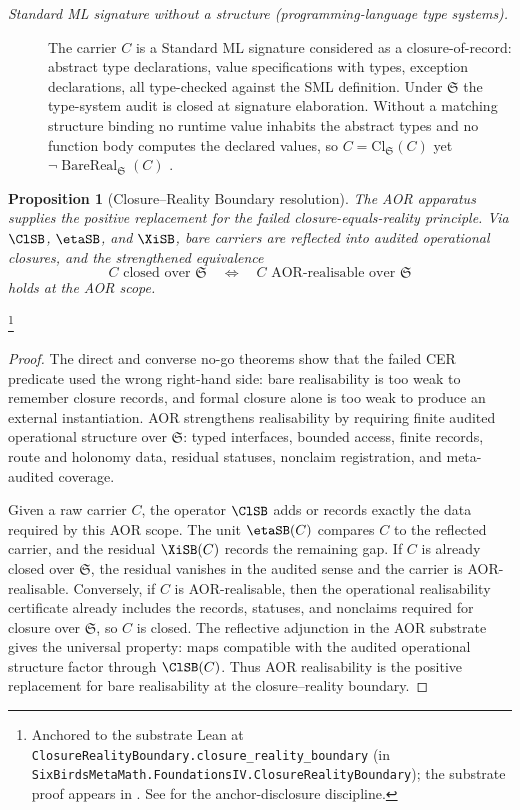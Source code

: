 \documentclass[11pt]{article}
\newtheorem{proposition}[theorem]{Proposition}
\theoremstyle{definition}
\begin{document}
\begin{description}
\item[\emph{Standard {ML} signature without a
structure (programming-language type systems).}]
The carrier \(C\) is a Standard ML signature
considered as a closure-of-record: abstract type
declarations, value specifications with types,
exception declarations, all type-checked against
the SML definition.  Under \(\mathfrak S\) the
type-system audit is closed at signature
elaboration.  Without a matching structure binding
no runtime value inhabits the abstract types and
no function body computes the declared values, so
\(C=\mathrm{Cl}_{\mathfrak S}(C)\) yet \(\neg
\operatorname{BareReal}_{\mathfrak S}(C)\)
\citep{MacQueen1984Modules}.
\end{description}

\begin{proposition}[Closure--Reality Boundary resolution]\label{prop:F53}
The AOR apparatus supplies the positive replacement for the failed
closure-equals-reality principle.  Via \(\ClSB\), \(\etaSB\), and
\(\XiSB\), bare carriers are reflected into audited operational
closures, and the strengthened equivalence
\[
  C \text{ closed over } \mathfrak S
  \quad\Longleftrightarrow\quad
  C \text{ AOR-realisable over } \mathfrak S
\]
holds at the AOR scope.
\end{proposition}
\footnote{\raggedright Anchored to the substrate Lean at
\texttt{ClosureRealityBoundary.\allowbreak{}closure\_reality\_boundary}
(in
\texttt{SixBirdsMetaMath.FoundationsIV.\allowbreak{}ClosureRealityBoundary});
the substrate proof appears in \citep{Tsiokos2026AOR}.  See
 for the anchor-disclosure discipline.}
\begin{proof}
The direct and converse no-go theorems show that the failed CER
predicate used the wrong right-hand side: bare realisability is too
weak to remember closure records, and formal closure alone is too
weak to produce an external instantiation.  AOR strengthens
realisability by requiring finite audited operational structure over
\(\mathfrak S\): typed interfaces, bounded access, finite records,
route and holonomy data, residual statuses, nonclaim registration,
and meta-audited coverage.

Given a raw carrier \(C\), the operator \(\ClSB\) adds or records
exactly the data required by this AOR scope.  The unit \(\etaSB(C)\)
compares \(C\) to the reflected carrier, and the residual \(\XiSB(C)\)
records the remaining gap.  If \(C\) is already closed over
\(\mathfrak S\), the residual vanishes in the audited sense and the
carrier is AOR-realisable.  Conversely, if \(C\) is AOR-realisable,
then the operational realisability certificate already includes the
records, statuses, and nonclaims required for closure over
\(\mathfrak S\), so \(C\) is closed.  The reflective adjunction in the
AOR substrate gives the universal property: maps compatible with the
audited operational structure factor through \(\ClSB(C)\).  Thus AOR
realisability is the positive replacement for bare realisability at
the closure--reality boundary.
\end{proof}
\end{document}
